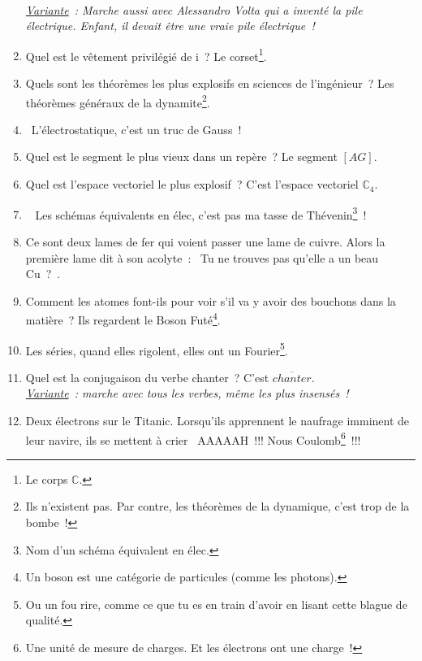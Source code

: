 \documentclass[10pt,a5paper,fullpage]{book}
\begin{document}
\begin{enumerate}
		\\\textit{\underline{Variante}~: Marche aussi avec Alessandro Volta qui a inventé la pile électrique. Enfant, il devait être une vraie pile électrique~!} 
		\item Quel est le vêtement privilégié de i~? Le corset\footnote{Le corps $\mathbb{C}$.}.
		\item Quels sont les théorèmes les plus explosifs en sciences de l’ingénieur~? Les théorèmes généraux de la dynamite\footnote{Ils n’existent pas. Par contre, les théorèmes de la dynamique, c’est trop de la bombe~!}.
		\item \guillemotleft~L’électrostatique, c’est un truc de Gauss~!~\guillemotright
		\item Quel est le segment le plus vieux dans un repère~? Le segment $[AG]$.
		\item Quel est l’espace vectoriel le plus explosif~? C’est l’espace vectoriel $\mathbb{C}_{4}$.
		\item \guillemotleft~ Les schémas équivalents en élec, c’est pas ma tasse de Thévenin\footnote{Nom d’un schéma équivalent en élec.}~! ~\guillemotright
		\item Ce sont deux lames de fer qui voient passer une lame de cuivre. Alors la première lame dit à son acolyte~: \guillemotleft~Tu ne trouves pas qu’elle a un beau Cu~?~\guillemotright.
		\item Comment les atomes font-ils pour voir s’il va y avoir des bouchons dans la matière~? Ils regardent le Boson Futé\footnote{Un boson est une catégorie de particules (comme les photons).}.
		\item Les séries, quand elles rigolent, elles ont un Fourier\footnote{Ou un fou rire, comme ce que tu es en train d'avoir en lisant cette blague de qualité.}.
		\item Quel est la conjugaison du verbe chanter~? C’est $\overline{chanter}$. \\\textit{\underline{Variante}~: marche avec tous les verbes, même les plus insensés~!}
		\item Deux électrons sur le Titanic. Lorsqu’ils apprennent le naufrage imminent de leur navire, ils se mettent à crier \guillemotleft~AAAAAH~!!! Nous Coulomb\footnote{Une unité de mesure de charges. Et les électrons ont une charge~!}~!!! ~\guillemotright

\end{enumerate}
\end{document}
